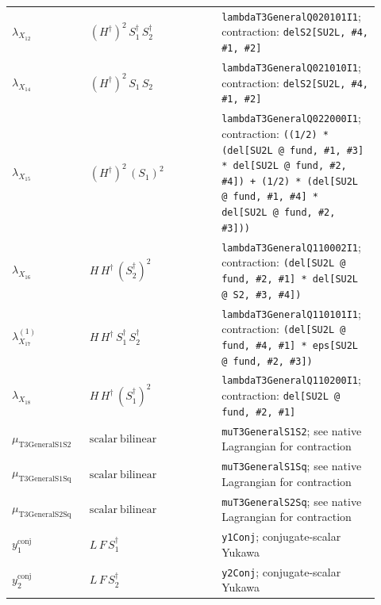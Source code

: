 \documentclass[8pt]{article}
\begin{document}
\begin{landscape}
\begin{longtable}{@{}p{0.20\linewidth}p{0.34\linewidth}p{0.38\linewidth}@{}}
$\lambda_{X_{12}}$ & $(H^\dagger)^{2}\,S_1^\dagger\,S_2^\dagger$ & \texttt{lambdaT3GeneralQ020101I1}; contraction: \texttt{delS2[SU2L, \#4, \#1, \#2]} \\
$\lambda_{X_{14}}$ & $(H^\dagger)^{2}\,S_1\,S_2$ & \texttt{lambdaT3GeneralQ021010I1}; contraction: \texttt{delS2[SU2L, \#4, \#1, \#2]} \\
$\lambda_{X_{15}}$ & $(H^\dagger)^{2}\,(S_1)^{2}$ & \texttt{lambdaT3GeneralQ022000I1}; contraction: \texttt{((1/2) * (del[SU2L @ fund, \#1, \#3] * del[SU2L @ fund, \#2, \#4]) + (1/2) * (del[SU2L @ fund, \#1, \#4] * del[SU2L @ fund, \#2, \#3]))} \\
$\lambda_{X_{16}}$ & $H\,H^\dagger\,(S_2^\dagger)^{2}$ & \texttt{lambdaT3GeneralQ110002I1}; contraction: \texttt{(del[SU2L @ fund, \#2, \#1] * del[SU2L @ S2, \#3, \#4])} \\
$\lambda_{X_{17}}^{(1)}$ & $H\,H^\dagger\,S_1^\dagger\,S_2^\dagger$ & \texttt{lambdaT3GeneralQ110101I1}; contraction: \texttt{(del[SU2L @ fund, \#4, \#1] * eps[SU2L @ fund, \#2, \#3])} \\
$\lambda_{X_{18}}$ & $H\,H^\dagger\,(S_1^\dagger)^{2}$ & \texttt{lambdaT3GeneralQ110200I1}; contraction: \texttt{del[SU2L @ fund, \#2, \#1]} \\
$\mu_{\mathrm{T3GeneralS1S2}}$ & $\mathrm{scalar\ bilinear}$ & \texttt{muT3GeneralS1S2}; see native Lagrangian for contraction \\
$\mu_{\mathrm{T3GeneralS1Sq}}$ & $\mathrm{scalar\ bilinear}$ & \texttt{muT3GeneralS1Sq}; see native Lagrangian for contraction \\
$\mu_{\mathrm{T3GeneralS2Sq}}$ & $\mathrm{scalar\ bilinear}$ & \texttt{muT3GeneralS2Sq}; see native Lagrangian for contraction \\
$y_{1}^{\mathrm{conj}}$ & $L\,F\,S_1^\dagger$ & \texttt{y1Conj}; conjugate-scalar Yukawa \\
$y_{2}^{\mathrm{conj}}$ & $L\,F\,S_2^\dagger$ & \texttt{y2Conj}; conjugate-scalar Yukawa \\
\bottomrule
\end{longtable}
\tiny

\end{landscape}
\end{document}
